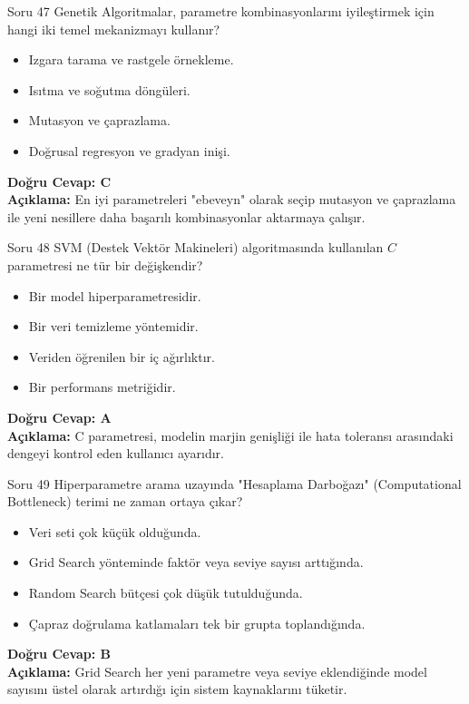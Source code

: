\documentclass[12pt,a4paper]{article}
\begin{document}
\begin{testcard}{Soru 47}
    Genetik Algoritmalar, parametre kombinasyonlarını iyileştirmek için hangi iki temel mekanizmayı kullanır?
    \begin{itemize}
        \item[A)] Izgara tarama ve rastgele örnekleme.
        \item[B)] Isıtma ve soğutma döngüleri.
        \item[C)] Mutasyon ve çaprazlama.
        \item[D)] Doğrusal regresyon ve gradyan inişi.
    \end{itemize}
    \tcblower
    \textbf{Doğru Cevap: C} \\
    \textbf{Açıklama:} En iyi parametreleri "ebeveyn" olarak seçip mutasyon ve çaprazlama ile yeni nesillere daha başarılı kombinasyonlar aktarmaya çalışır.
\end{testcard}

\begin{testcard}{Soru 48}
    SVM (Destek Vektör Makineleri) algoritmasında kullanılan $C$ parametresi ne tür bir değişkendir?
    \begin{itemize}
        \item[A)] Bir model hiperparametresidir.
        \item[B)] Bir veri temizleme yöntemidir.
        \item[C)] Veriden öğrenilen bir iç ağırlıktır.
        \item[D)] Bir performans metriğidir.
    \end{itemize}
    \tcblower
    \textbf{Doğru Cevap: A} \\
    \textbf{Açıklama:} C parametresi, modelin marjin genişliği ile hata toleransı arasındaki dengeyi kontrol eden kullanıcı ayarıdır.
\end{testcard}

\begin{testcard}{Soru 49}
    Hiperparametre arama uzayında "Hesaplama Darboğazı" (Computational Bottleneck) terimi ne zaman ortaya çıkar?
    \begin{itemize}
        \item[A)] Veri seti çok küçük olduğunda.
        \item[B)] Grid Search yönteminde faktör veya seviye sayısı arttığında.
        \item[C)] Random Search bütçesi çok düşük tutulduğunda.
        \item[D)] Çapraz doğrulama katlamaları tek bir grupta toplandığında.
    \end{itemize}
    \tcblower
    \textbf{Doğru Cevap: B} \\
    \textbf{Açıklama:} Grid Search her yeni parametre veya seviye eklendiğinde model sayısını üstel olarak artırdığı için sistem kaynaklarını tüketir.
\end{testcard}
\end{document}
